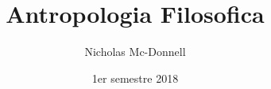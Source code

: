 

\title{Antropologia Filosofica}
\author{Nicholas Mc-Donnell}
\date{1er semestre 2018}



    \maketitle

